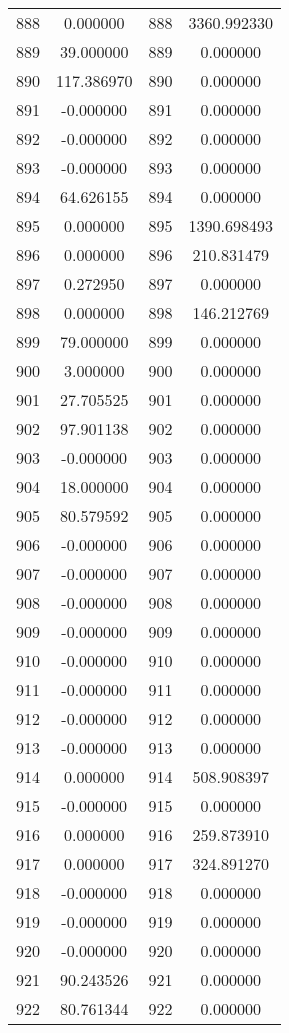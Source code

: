 \documentclass[12pt]{article}
\begin{document}
\begin{longtable}{@{}cccc@{}}
888 & 0.000000 & 888 & 3360.992330 \\
889 & 39.000000 & 889 & 0.000000 \\
890 & 117.386970 & 890 & 0.000000 \\
891 & -0.000000 & 891 & 0.000000 \\
892 & -0.000000 & 892 & 0.000000 \\
893 & -0.000000 & 893 & 0.000000 \\
894 & 64.626155 & 894 & 0.000000 \\
895 & 0.000000 & 895 & 1390.698493 \\
896 & 0.000000 & 896 & 210.831479 \\
897 & 0.272950 & 897 & 0.000000 \\
898 & 0.000000 & 898 & 146.212769 \\
899 & 79.000000 & 899 & 0.000000 \\
900 & 3.000000 & 900 & 0.000000 \\
901 & 27.705525 & 901 & 0.000000 \\
902 & 97.901138 & 902 & 0.000000 \\
903 & -0.000000 & 903 & 0.000000 \\
904 & 18.000000 & 904 & 0.000000 \\
905 & 80.579592 & 905 & 0.000000 \\
906 & -0.000000 & 906 & 0.000000 \\
907 & -0.000000 & 907 & 0.000000 \\
908 & -0.000000 & 908 & 0.000000 \\
909 & -0.000000 & 909 & 0.000000 \\
910 & -0.000000 & 910 & 0.000000 \\
911 & -0.000000 & 911 & 0.000000 \\
912 & -0.000000 & 912 & 0.000000 \\
913 & -0.000000 & 913 & 0.000000 \\
914 & 0.000000 & 914 & 508.908397 \\
915 & -0.000000 & 915 & 0.000000 \\
916 & 0.000000 & 916 & 259.873910 \\
917 & 0.000000 & 917 & 324.891270 \\
918 & -0.000000 & 918 & 0.000000 \\
919 & -0.000000 & 919 & 0.000000 \\
920 & -0.000000 & 920 & 0.000000 \\
921 & 90.243526 & 921 & 0.000000 \\
922 & 80.761344 & 922 & 0.000000 \\

\end{longtable}
\end{document}
